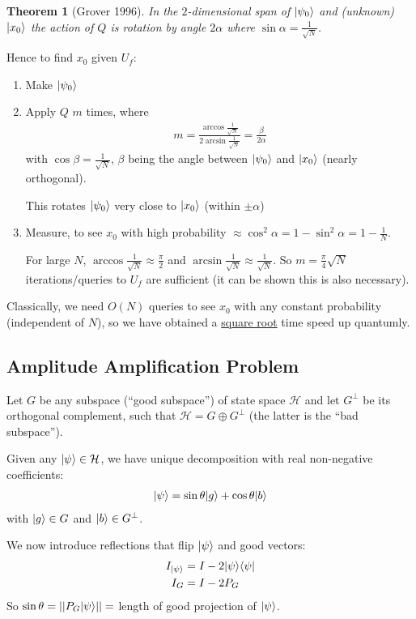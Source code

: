 \documentclass[]{article}
\DeclarePairedDelimiter\bra{\langle}{\rvert}
\DeclarePairedDelimiter\ket{\lvert}{\rangle}
\theoremstyle{custhm}
\theoremstyle{cusdef}
\theoremstyle{custhm}
\theoremstyle{custhm}
\theoremstyle{custhm}
\theoremstyle{custhm}
\newtheorem*{theorem*}{Theorem}
\theoremstyle{cusdef}
\theoremstyle{remark}
\begin{document}
\begin{theorem*}[Grover 1996]
	In the $2$-dimensional span of $\ket{\psi_0}$ and (unknown) $\ket{x_0}$ the action of $Q$ is rotation by angle $2\alpha$ where $\sin\alpha = \frac{1}{\sqrt{N}}$.
\end{theorem*}
Hence to find $x_0$ given $U_f$:
\begin{enumerate}
	\item Make $\ket{\psi_0}$
	\item Apply $Q$ $m$ times, where
	\begin{align*}
		m = \frac{\arccos \frac{1}{\sqrt{N}}}{2\arcsin\frac{1}{\sqrt{N}}} = \frac{\beta}{2\alpha}
	\end{align*}
	with $\cos\beta = \frac{1}{\sqrt{N}}$, $\beta$ being the angle between $\ket{\psi_0}$ and $\ket{x_0}$ (nearly orthogonal).

	This rotates $\ket{\psi_0}$ very close to $\ket{x_0}$ (within $\pm \alpha$)

	\item Measure, to see $x_0$ with high probability $\approx \cos^2\alpha  = 1 - \sin^2\alpha = 1 - \frac{1}{N}$.
	
	For large $N$, $\arccos\frac{1}{\sqrt{N}} \approx \frac{\pi}{2}$ and $\arcsin\frac{1}{\sqrt{N}} \approx \frac{1}{\sqrt{N}}$. So $m = \frac{\pi}{4}\sqrt{N}$ iterations/queries to $U_f$ are sufficient (it can be shown this is also necessary).
\end{enumerate}

Classically, we need $O(N)$ queries to see $x_0$ with any constant probability (independent of $N$), so we have obtained a \underline{square root} time speed up quantumly.

\subsection*{Amplitude Amplification Problem}

Let $G$ be any subspace (``good subspace'') of state space $\mathcal{H}$ and let $G^{\perp}$ be its orthogonal complement, such that $\mathcal{H} = G \oplus G^\perp$ (the latter is the ``bad subspace'').

Given any $\ket{\psi}\in \mathcal{H}$, we have unique decomposition with real non-negative coefficients:
\begin{align*}
	\ket{\psi} = \sin\theta \ket{g} + \cos\theta\ket{b}
\end{align*}
with $\ket{g} \in G$ and $\ket{b}\in G^\perp$.

We now introduce reflections that flip $\ket{\psi}$ and good vectors:
\begin{align*}
	I_{\ket{\psi}} &= I - 2\ket{\psi}\bra{\psi}\\
	I_G &= I - 2P_G
\end{align*}
So $\sin \theta = ||P_G\ket{\psi}|| = $ length of good projection of $\ket{\psi}$.
\end{document}
